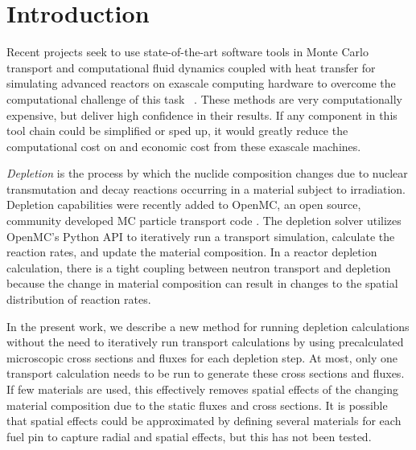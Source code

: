 \section{Introduction}\label{}

    Recent projects seek to use state-of-the-art software tools in Monte Carlo
    transport and computational fluid dynamics coupled with heat transfer for
    simulating advanced reactors on exascale computing hardware to overcome the
    computational challenge of this task ~\citep{romano2021nse,merzari2023sc}.
    These methods are very computationally expensive, but deliver high
    confidence in their results. If any component in this tool chain could be
    simplified or sped up, it would greatly reduce the computational cost on and
    economic cost from these exascale machines.

    {\it Depletion} is the process by which the nuclide composition changes due
    to nuclear transmutation and decay reactions occurring in a material subject
    to irradiation. Depletion capabilities were recently added to OpenMC, an
    open source, community developed MC particle transport code
    \citep{romano_openmc_2015, romano_depletion_2021}. The depletion solver
    utilizes OpenMC's Python API to iteratively run a transport simulation,
    calculate the reaction rates, and update the material composition.
    In a reactor depletion calculation, there is a tight coupling between
    neutron transport and depletion because the change in material composition
    can result in changes to the spatial distribution of reaction rates.

    In the present work, we describe a new method for running depletion
    calculations without the need to iteratively run transport calculations by
    using precalculated microscopic cross sections and fluxes for each depletion
    step.  At most, only one transport calculation needs to be run to generate
    these cross sections and fluxes. If few materials are used, this effectively
    removes spatial effects of the changing material composition due to the
    static fluxes and cross sections. It is possible that spatial effects could
    be approximated by defining several materials for each fuel pin to capture
    radial and spatial effects, but this has not been tested.

